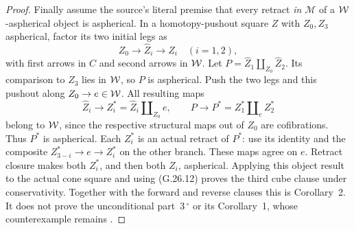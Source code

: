 \begin{proof}
Finally assume the source's literal premise that every retract \emph{in $\mathcal M$} of a $\mathcal{W}$-aspherical object is aspherical. In a homotopy-pushout square $Z$ with $Z_0,Z_3$ aspherical, factor its two initial legs as
\[
Z_0\longrightarrow\widehat Z_i\longrightarrow Z_i
\quad(i=1,2),
\]
with first arrows in $C$ and second arrows in $\mathcal{W}$. Let $P=\widehat Z_1\amalg_{Z_0}\widehat Z_2$. Its comparison to $Z_3$ lies in $\mathcal{W}$, so $P$ is aspherical. Push the two legs and this pushout along $Z_0\to e\in\mathcal{W}$. All resulting maps
\[
\widehat Z_i\longrightarrow Z_i^*=\widehat Z_i\amalg_{Z_0}e,
\qquad
P\longrightarrow P^*=Z_1^*\amalg_e Z_2^*
\]
belong to $\mathcal{W}$, since the respective structural maps out of $Z_0$ are cofibrations. Thus $P^*$ is aspherical. Each $Z_i^*$ is an actual retract of $P^*$: use its identity and the composite $Z_{3-i}^*\to e\to Z_i^*$ on the other branch. These maps agree on $e$. Retract closure makes both $Z_i^*$, and then both $Z_i$, aspherical. Applying this object result to the actual cone square and using (G.26.12) proves the third cube clause under conservativity. Together with the forward and reverse clauses this is Corollary~2. It does not prove the unconditional part~3\,$^\circ$ or its Corollary~1, whose counterexample remains .
\end{proof}
